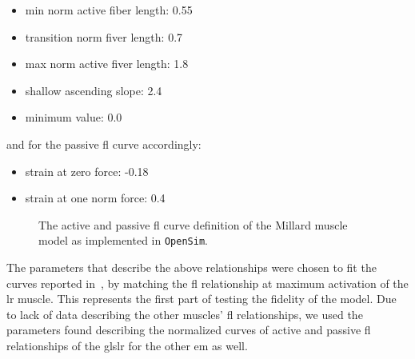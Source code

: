 \documentclass[11pt,a4paper,draft=false]{report}
\begin{document}
\begin{itemize}
\item min norm active fiber length: 0.55
\item transition norm fiver length: 0.7
\item max norm active fiver length: 1.8
\item shallow ascending slope: 2.4
\item minimum value: 0.0
\end{itemize}
%
and for the passive \gls{fl} curve accordingly:

\begin{itemize}
\item strain at zero force: -0.18
\item strain at one norm force: 0.4
\end{itemize}

\begin{figure}[ht]
  \caption{The active and passive \gls{fl} curve definition of the Millard
    muscle model as implemented in \texttt{OpenSim}.}\label{fig:millard-curves}
\end{figure}

The parameters that describe the above relationships were chosen to fit the
curves reported in~\cite{Iskander2018}, by matching the \gls{fl} relationship at
maximum activation of the \gls{lr} muscle. This represents the first part of
testing the fidelity of the model. Due to lack of data describing the other
muscles’ \gls{fl} relationships, we used the parameters found describing the
normalized curves of active and passive \gls{fl} relationships of the gls{lr}
for the other \gls{em} as well.
\end{document}
